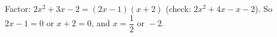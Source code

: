Factor: $2x^2+3x-2=(2x-1)(x+2)$ (check: $2x^2+4x-x-2$). So $2x-1=0$ or $x+2=0$, and $x=\boxed{\dfrac{1}{2}\text{ or }-2}$.
